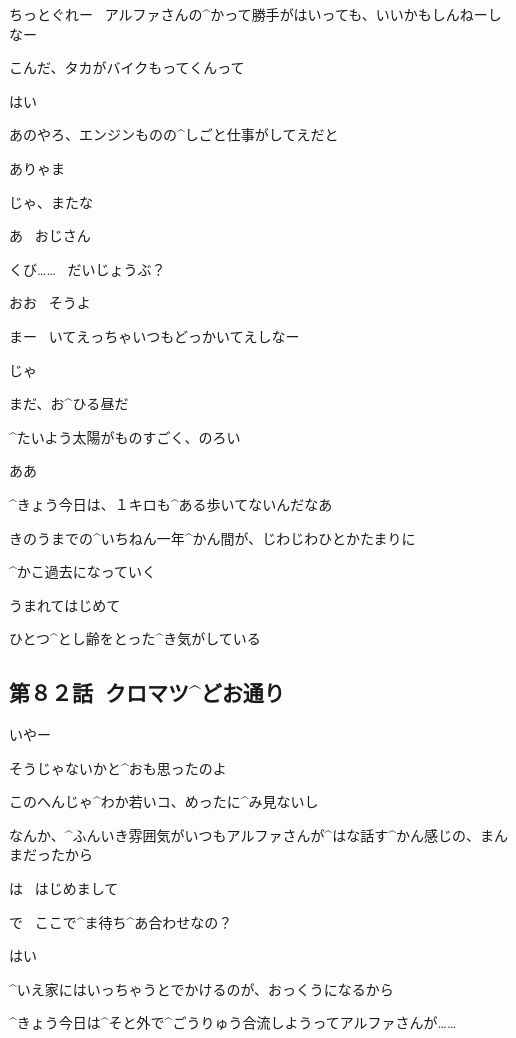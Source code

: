\Ojisan ちっとぐれー
\ アルファさんの^{かって}{勝手}がはいっても、いいかもしんねーしなー

\page
\Ojisan こんだ、タカがバイクもってくんって

\Alpha はい

\Ojisan あのやろ、エンジンものの^{しごと}{仕事}がしてえだと

\Alpha ありゃま

\Ojisan じゃ、またな

\Alpha あ
\ おじさん

\page
\Alpha くび……
\ だいじょうぶ？

\Ojisan おお
\ そうよ

\Ojisan まー
\ いてえっちゃいつもどっかいてえしなー

\Ojisan じゃ

\page[67]
\Alpha まだ、お^{ひる}{昼}だ

\Alpha ^{たいよう}{太陽}がものすごく、のろい

\Alpha ああ

\Alpha ^{きょう}{今日}は、１キロも^{ある}{歩}いてないんだなあ

\page
\Alpha きのうまでの^{いちねん}{一年}^{かん}{間}が、じわじわひとかたまりに

\Alpha ^{かこ}{過去}になっていく

\Alpha うまれてはじめて

\Alpha ひとつ^{とし}{齢}をとった^{き}{気}がしている


\subsection{第８２話\ クロマツ^{どお}{通}り}

\page[73]
\Sensei いやー

\Sensei そうじゃないかと^{おも}{思}ったのよ

\Sensei このへんじゃ^{わか}{若}いコ、めったに^{み}{見}ないし

\Sensei なんか、^{ふんいき}{雰囲気}がいつもアルファさんが^{はな}{話}す^{かん}{感}じの、まんまだったから

\Kokone は
\ はじめまして

\page
\Sensei で
\ ここで^{ま}{待}ち^{あ}{合}わせなの？

\Kokone はい

\Kokone ^{いえ}{家}にはいっちゃうとでかけるのが、おっくうになるから

\Kokone ^{きょう}{今日}は^{そと}{外}で^{ごうりゅう}{合流}しようってアルファさんが……

